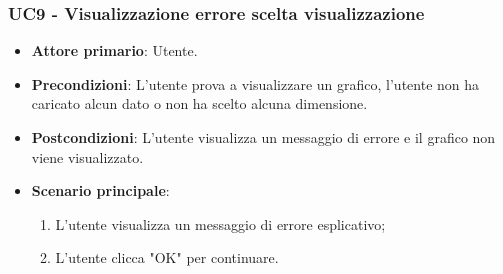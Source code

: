 \subsubsection{UC9 - Visualizzazione errore scelta visualizzazione}
\begin{itemize}
	\item \textbf{Attore primario}: Utente.
	\item \textbf{Precondizioni}: L'utente prova a visualizzare un grafico, l'utente non ha caricato alcun dato o non ha scelto alcuna dimensione.
	\item \textbf{Postcondizioni}: L'utente visualizza un messaggio di errore e il grafico non viene visualizzato.
	\item \textbf{Scenario principale}:
		\begin{enumerate}
			\item L'utente visualizza un messaggio di errore esplicativo;
			\item L'utente clicca "OK" per continuare.
		\end{enumerate}
\end{itemize}